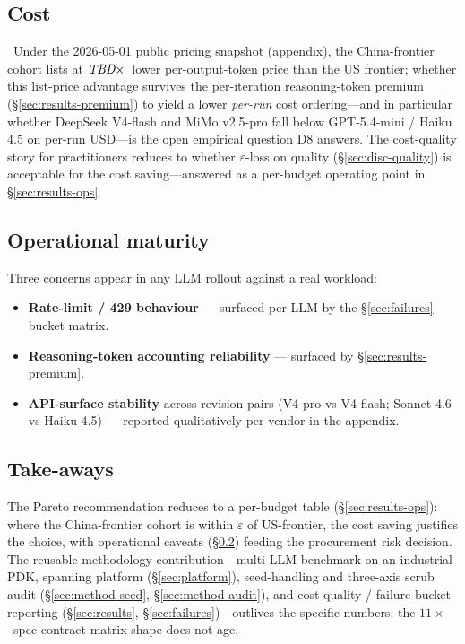 \subsection{Cost}
\label{sec:disc-cost}

\tbdeight\ Under the 2026-05-01 public pricing snapshot (appendix),
the China-frontier cohort lists at $\textit{TBD}\times$~lower
per-output-token price than the US frontier; whether this
list-price advantage survives the per-iteration reasoning-token
premium (\S\ref{sec:results-premium}) to yield a lower
\emph{per-run} cost ordering---and in particular whether DeepSeek
V4-flash and MiMo v2.5-pro fall below GPT-5.4-mini / Haiku 4.5 on
per-run USD---is the open empirical question D8 answers. The
cost-quality story for practitioners reduces to whether
$\varepsilon$-loss on quality (\S\ref{sec:disc-quality}) is
acceptable for the cost saving---answered as a per-budget operating
point in \S\ref{sec:results-ops}.

\subsection{Operational maturity}
\label{sec:disc-ops}

Three concerns appear in any LLM rollout against a real workload:
\begin{itemize}
  \item \textbf{Rate-limit / 429 behaviour} --- surfaced per LLM
    by the \S\ref{sec:failures} bucket matrix.
  \item \textbf{Reasoning-token accounting reliability} ---
    surfaced by \S\ref{sec:results-premium}.
  \item \textbf{API-surface stability} across revision pairs
    (V4-pro vs V4-flash; Sonnet 4.6 vs Haiku 4.5) --- reported
    qualitatively per vendor in the appendix.
\end{itemize}

\subsection{Take-aways}
\label{sec:disc-takeaways}

The Pareto recommendation reduces to a per-budget table
(\S\ref{sec:results-ops}): where the China-frontier cohort is
within $\varepsilon$ of US-frontier, the cost saving justifies the
choice, with operational caveats (\S\ref{sec:disc-ops}) feeding the
procurement risk decision. The reusable methodology
contribution---multi-LLM benchmark on an industrial PDK,
spanning platform (\S\ref{sec:platform}), seed-handling and
three-axis scrub audit (\S\ref{sec:method-seed},
\S\ref{sec:method-audit}), and cost-quality / failure-bucket
reporting (\S\ref{sec:results}, \S\ref{sec:failures})---outlives
the specific numbers: the $11\times$~spec-contract matrix shape
does not age.
